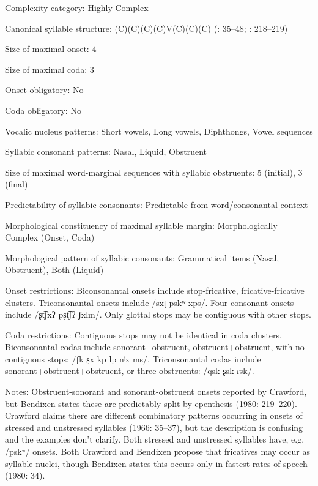 {\begin{appendixdesc}
\item[Complexity category:] Highly Complex

\item[Canonical syllable structure:] (C)(C)(C)(C)V(C)(C)(C) (\citealt{Crawford1966}: 35--48; \citealt{Bendixen1980}: 218--219)

\item[Size of maximal onset:] 4

\item[Size of maximal coda:] 3

\item[Onset obligatory:] No

\item[Coda obligatory:] No

\item[Vocalic nucleus patterns:] Short vowels, Long vowels, Diphthongs, Vowel sequences

\item[Syllabic consonant patterns:] Nasal, Liquid, Obstruent

\item[Size of maximal word-marginal sequences with syllabic obstruents:] 5 (initial), 3 (final)

\item[Predictability of syllabic consonants:] Predictable from word/consonantal context

\item[Morphological constituency of maximal syllable margin:] Morphologically Complex (Onset, Coda)

\item[Morphological pattern of syllabic consonants:] Grammatical items (Nasal, Obstruent), Both (Liquid)

\item[Onset restrictions:] Biconsonantal onsets include stop-fricative, fricative-fricative clusters. Triconsonantal onsets include /sxʈ pskʷ xps/. Four-consonant onsets include /ʂt͡ʃxʔ pʂt͡ʃʔ ʃxlm/. Only glottal stops may be contiguous with other stops.

\item[Coda restrictions:] Contiguous stops may not be identical in coda clusters. Biconsonantal codas include sonorant+obstruent, obstruent+obstruent, with no contiguous stops: /ʃk ʂx kp lp nʲx ms/. Triconsonantal codas include sonorant+obstruent+obstruent, or three obstruents: /qsk ʂsk ɾsk/.

\item[Notes:] Obstruent-sonorant and sonorant-obstruent onsets reported by Crawford, but Bendixen states these are predictably split by epenthesis (1980: 219--220). Crawford claims there are different combinatory patterns occurring in onsets of stressed and unstressed syllables (1966: 35--37), but the description is confusing and the examples don’t clarify. Both stressed and unstressed syllables have, e.g. /pskʷ/ onsets. Both Crawford and Bendixen propose that fricatives may occur as syllable nuclei, though Bendixen states this occurs only in fastest rates of speech (1980: 34).
\end{appendixdesc}
}
